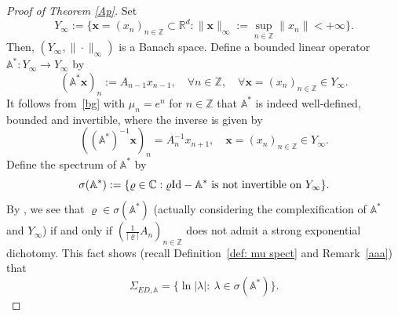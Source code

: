 \documentclass[reqno, a4paper, 10pt]{amsart}
\theoremstyle{plain}
\numberwithin{equation}{section}
\theoremstyle{remark}
\def\R{\mathbb{R}}
\def\Id{\text{\rm Id}}
\def\Z{\mathbb{Z}}
\begin{document}
\begin{proof}[Proof of Theorem \ref{Ap}] Set
\[
Y_\infty:=\bigg \{ \mathbf x=(x_n)_{n\in \Z} \subset \R^d: \|\mathbf x\|_\infty:=\sup_{n\in \Z} \|x_n\| <+\infty \bigg \}.
\]
Then, $(Y_\infty, \| \cdot \|_\infty)$ is a Banach space. Define a bounded linear operator $ \mathbb A ^\ast \colon Y_\infty \to Y_\infty$  by 
\begin{equation}\label{operator}
(\mathbb A ^\ast \mathbf x)_n:=A_{n-1}x_{n-1}, \quad \forall n\in \Z, \quad \forall \mathbf x=(x_n)_{n\in \Z}\in Y_\infty.
\end{equation}
It follows from~\eqref{bg} with $\mu_n=e^n$ for $n\in \Z$ that $\mathbb A^\ast$ is indeed well-defined, bounded and invertible, where the inverse is given by 
\[
((\mathbb A^\ast) ^{-1}\mathbf x)_n=A_n^{-1}x_{n+1}, \quad \mathbf x=(x_n)_{n\in \mathbb Z}\in Y_\infty.
\]
Define the spectrum of $\mathbb A ^\ast $ by
\[
\sigma(\mathbb A ^\ast):=\{\varrho\in \mathbb C: \varrho\Id-\mathbb A ^\ast ~\mbox{is not invertible on $Y_\infty$}\}.
\]
By \cite[Lemma 2]{DZZ}, we see that $\varrho\in \sigma(\mathbb A^\ast)$ (actually considering the complexification of $\mathbb A^\ast$ and $Y_\infty$)
if and only if $\left(\frac{1}{|\varrho|}A_n\right)_{n\in \Z}$ does not admit a strong exponential dichotomy. This fact shows (recall Definition~\ref{def: mu spect} and Remark~\ref{aaa}) that
\[
\Sigma_{ED, \mathbb A}=\{\ln |\lambda |: \  \lambda \in \sigma(\mathbb A^\ast)\}.
\]





\end{proof}
\end{document}
